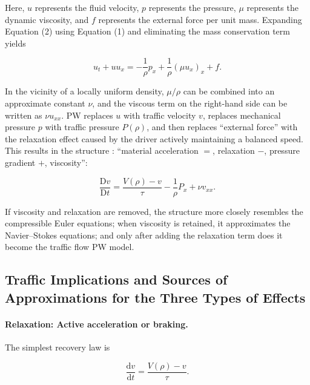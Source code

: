 \documentclass[11pt,a4paper,openany]{book}
\numberwithin{equation}{chapter}
\numberwithin{figure}{chapter}
\numberwithin{table}{chapter}
\begin{document}
Here, $u$ represents the fluid velocity, $p$ represents the pressure, $\mu$ represents the dynamic viscosity, and $f$ represents the external force per unit mass. Expanding Equation (2) using Equation (1) and eliminating the mass conservation term yields

\begin{equation}
u_t+uu_x
=-\frac{1}{\rho}p_x
+\frac{1}{\rho}(\mu u_x)_x+f.
\label{eq:ns-nonconservative}
\end{equation}

In the vicinity of a locally uniform density, $\mu/\rho$ can be combined into an approximate constant $\nu$, and the viscous term on the right-hand side can be written as $\nu u_{xx}$. PW replaces $u$ with traffic velocity $v$, replaces mechanical pressure $p$ with traffic pressure $P(\rho)$, and then replaces “external force” with the relaxation effect caused by the driver actively maintaining a balanced speed. This results in the structure \cite{payne1971}: “material acceleration $=$, relaxation $-$, pressure gradient $+$, viscosity”:

\begin{equation}
\boxed{
\frac{\mathrm Dv}{\mathrm Dt}
=\frac{V(\rho)-v}{\tau}
-\frac{1}{\rho}P_x
+\nu v_{xx}.}
\label{eq:pw-force-balance}
\end{equation}

If viscosity and relaxation are removed, the structure more closely resembles the compressible Euler equations; when viscosity is retained, it approximates the Navier–Stokes equations; and only after adding the relaxation term does it become the traffic flow PW model.










\subsection{Traffic Implications and Sources of Approximations for the Three Types of Effects}

\paragraph{Relaxation: Active acceleration or braking.}


The simplest recovery law is

\begin{equation}
\frac{\mathrm dv}{\mathrm dt}
=\frac{V(\rho)-v}{\tau}.
\label{eq:pw-relaxation-alone}
\end{equation}
\end{document}
